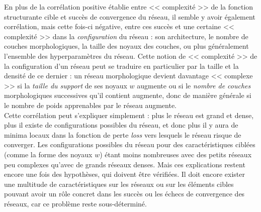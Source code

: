 En plus de la corrélation positive établie entre << complexité >> de la fonction structurante cible et succès de convergence du réseau, il semble y avoir également corrélation, mais cette fois-ci négative, entre ces succès et une certaine << complexité >> dans la \textit{configuration} du réseau : son architecture, le nombre de couches morphologiques, la taille des noyaux des couches, ou plus généralement l'ensemble des hyperparamètres du réseau. 
Cette notion de << complexité >> de la configuration d'un réseau peut se traduire en particulier par la taille et la densité de ce dernier : un réseau morphologique devient davantage << complexe >> si la \textit{taille du support} de ses noyaux $w$ augmente ou si le \textit{nombre de couches} morphologiques successives qu'il contient augmente, donc de manière générale si le nombre de poids apprenables par le réseau augmente. \\

\vspace{-1.6mm}
\noindent Cette corrélation peut s'expliquer simplement : plus le réseau est grand et dense, plus il existe de configurations possibles du réseau, et donc plus il y aura de minima locaux dans la fonction de perte \textit{loss} vers lesquels le réseau risque de converger. Les configurations possibles du réseau pour des caractéristiques ciblées (comme la forme des noyaux $w$) étant moins nombreuses avec des petits réseaux peu complexes qu'avec de grands réseaux denses. 
Mais ces explications restent encore une fois des hypothèses, qui doivent être vérifiées. Il doit encore exister une multitude de caractéristiques sur les réseaux ou sur les éléments cibles pouvant avoir un rôle concret dans les succès ou les échecs de convergence des réseaux, car ce problème reste sous-déterminé.



